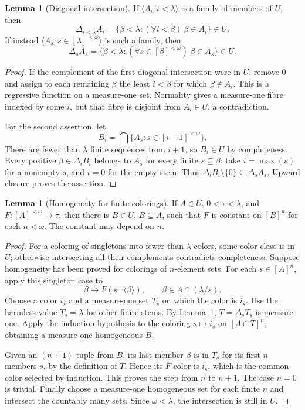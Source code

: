 \documentclass[11pt,letterpaper]{article}
\theoremstyle{definition}
\newtheorem{lemma}[definition]{Lemma}
\numberwithin{equation}{section}
\begin{document}
\begin{lemma}[Diagonal intersection]\label{lem:diagonal}
If $\langle A_i:i<\lambda\rangle$ is a family of members of $U$, then
\[
 \Delta_{i<\lambda}A_i=\{\beta<\lambda:(\forall i<\beta)\ \beta\in A_i\}\in U.
\]
If instead $\langle A_s:s\in[\lambda]^{<\omega}\rangle$ is such a family, then
\[
 \Delta_s A_s
 =\{\beta<\lambda:(\forall s\in[\beta]^{<\omega})\ \beta\in A_s\}\in U.
\]
\end{lemma}

\begin{proof}
If the complement of the first diagonal intersection were in $U$, remove $0$ and assign to each remaining $\beta$ the least $i<\beta$ for which $\beta\notin A_i$. This is a regressive function on a measure-one set. Normality gives a measure-one fibre indexed by some $i$, but that fibre is disjoint from $A_i\in U$, a contradiction.

For the second assertion, let
\[
 B_i=\bigcap\{A_s:s\in[i+1]^{<\omega}\}.
\]
There are fewer than $\lambda$ finite sequences from $i+1$, so $B_i\in U$ by completeness. Every positive $\beta\in\Delta_iB_i$ belongs to $A_s$ for every finite $s\subseteq\beta$: take $i=\max(s)$ for a nonempty $s$, and $i=0$ for the empty stem. Thus $\Delta_iB_i\setminus\{0\}\subseteq\Delta_sA_s$. Upward closure proves the assertion.
\end{proof}

\begin{lemma}[Homogeneity for finite colorings]\label{lem:homogeneous}
If $A\in U$, $0<\tau<\lambda$, and $F:[A]^{<\omega}\to\tau$, then there is $B\in U$, $B\subseteq A$, such that $F$ is constant on $[B]^n$ for each $n<\omega$. The constant may depend on $n$.
\end{lemma}

\begin{proof}
For a coloring of singletons into fewer than $\lambda$ colors, some color class is in $U$; otherwise intersecting all their complements contradicts completeness. Suppose homogeneity has been proved for colorings of $n$-element sets. For each $s\in[A]^n$, apply this singleton case to
\[
 \beta\longmapsto F(s^\frown\langle\beta\rangle),
 \qquad \beta\in A\cap(\lambda/s).
\]
Choose a color $i_s$ and a measure-one set $T_s$ on which the color is $i_s$. Use the harmless value $T_s=\lambda$ for other finite stems. By Lemma~\ref{lem:diagonal}, $T=\Delta_sT_s$ is measure one. Apply the induction hypothesis to the coloring $s\mapsto i_s$ on $[A\cap T]^n$, obtaining a measure-one homogeneous $B$.

Given an $(n+1)$-tuple from $B$, its last member $\beta$ is in $T_s$ for its first $n$ members $s$, by the definition of $T$. Hence its $F$-color is $i_s$, which is the common color selected by induction. This proves the step from $n$ to $n+1$. The case $n=0$ is trivial. Finally choose a measure-one homogeneous set for each finite $n$ and intersect the countably many sets. Since $\omega<\lambda$, the intersection is still in $U$.
\end{proof}
\end{document}
